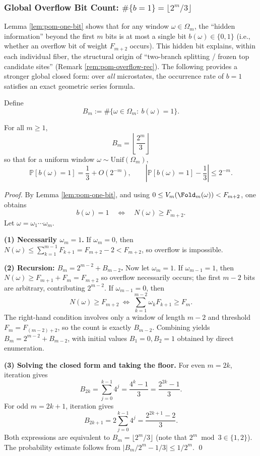 \subsubsection{Global Overflow Bit Count: \texorpdfstring{$\#\{b=1\}=\lfloor 2^m/3\rfloor$}{b=1 count = floor(2^m/3)}}\label{subsec:pom-overflow-global}
Lemma \ref{lem:pom-one-bit} shows that for any window \(\omega\in\Omega_m\), the ``hidden information'' beyond the first \(m\) bits is at most a single bit \(b(\omega)\in\{0,1\}\) (i.e., whether an overflow bit of weight \(F_{m+2}\) occurs). This hidden bit explains, within each individual fiber, the structural origin of ``two-branch splitting / frozen top candidate sites'' (Remark \ref{rem:pom-overflow-rec}). The following provides a stronger global closed form: over \emph{all} microstates, the occurrence rate of \(b=1\) satisfies an exact geometric series formula.

\begin{definition}\label{def:pom-overflow-global-count}
Define
\[
B_m:=\#\{\omega\in\Omega_m:\ b(\omega)=1\}.
\]
\end{definition}

\begin{theorem}\label{thm:pom-overflow-global-count}
For all \(m\ge 1\),
\[
\boxed{\;
B_m=\left\lfloor\frac{2^m}{3}\right\rfloor\;}
\]
so that for a uniform window \(\omega\sim\mathrm{Unif}(\Omega_m)\),
\[
\mathbb{P}[b(\omega)=1]=\frac{1}{3}+O(2^{-m}),
\qquad
\left|\mathbb{P}[b(\omega)=1]-\frac{1}{3}\right|\le 2^{-m}.
\]
\end{theorem}
\begin{proof}
By Lemma \ref{lem:pom-one-bit}, and using \(0\le V_m(\Fold_m(\omega))<F_{m+2}\), one obtains
\[
b(\omega)=1
\quad\Longleftrightarrow\quad
N(\omega)\ge F_{m+2}.
\]
Let \(\omega=\omega_1\cdots\omega_m\).

\textbf{(1) Necessarily \(\omega_m=1\).}
If \(\omega_m=0\), then
\(
N(\omega)\le \sum_{k=1}^{m-1}F_{k+1}=F_{m+2}-2<F_{m+2}
\), so overflow is impossible.

\textbf{(2) Recursion: \(B_m=2^{m-2}+B_{m-2}\).}
Now let \(\omega_m=1\).
If \(\omega_{m-1}=1\), then
\(
N(\omega)\ge F_{m+1}+F_m=F_{m+2}
\)
so overflow necessarily occurs; the first \(m-2\) bits are arbitrary, contributing \(2^{m-2}\).
If \(\omega_{m-1}=0\), then
\[
N(\omega)\ge F_{m+2}
\ \Longleftrightarrow\
\sum_{k=1}^{m-2}\omega_kF_{k+1}\ge F_m.
\]
The right-hand condition involves only a window of length \(m-2\) and threshold \(F_m=F_{(m-2)+2}\), so the count is exactly \(B_{m-2}\).
Combining yields \(B_m=2^{m-2}+B_{m-2}\), with initial values \(B_1=0,B_2=1\) obtained by direct enumeration.

\textbf{(3) Solving the closed form and taking the floor.}
For even \(m=2k\), iteration gives
\[
B_{2k}=\sum_{j=0}^{k-1}4^j=\frac{4^k-1}{3}=\frac{2^{2k}-1}{3}.
\]
For odd \(m=2k+1\), iteration gives
\[
B_{2k+1}=2\sum_{j=0}^{k-1}4^j=\frac{2^{2k+1}-2}{3}.
\]
Both expressions are equivalent to \(B_m=\lfloor 2^m/3\rfloor\) (note that \(2^m\bmod 3\in\{1,2\}\)).
The probability estimate follows from
\(
\bigl|B_m/2^m-1/3\bigr|\le 1/2^m
\). \qed
\end{proof}

